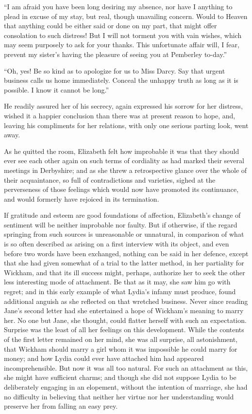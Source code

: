 ``I am afraid you have been long desiring my absence, nor have I anything to plead in excuse of my stay, but real, though unavailing concern. Would to Heaven that anything could be either said or done on my part, that might offer consolation to such distress! But I will not torment you with vain wishes, which may seem purposely to ask for your thanks. This unfortunate affair will, I fear, prevent my sister's having the pleasure of seeing you at Pemberley to-day.''

``Oh, yes! Be so kind as to apologize for us to Miss Darcy. Say that urgent business calls us home immediately. Conceal the unhappy truth as long as it is possible. I know it cannot be long.''

He readily assured her of his secrecy, again expressed his sorrow for her distress, wished it a happier conclusion than there was at present reason to hope, and, leaving his compliments for her relations, with only one serious parting look, went away.

As he quitted the room, Elizabeth felt how improbable it was that they should ever see each other again on such terms of cordiality as had marked their several meetings in Derbyshire; and as she threw a retrospective glance over the whole of their acquaintance, so full of contradictions and varieties, sighed at the perverseness of those feelings which would now have promoted its continuance, and would formerly have rejoiced in its termination.

If gratitude and esteem are good foundations of affection, Elizabeth's change of sentiment will be neither improbable nor faulty. But if otherwise, if the regard springing from such sources is unreasonable or unnatural, in comparison of what is so often described as arising on a first interview with its object, and even before two words have been exchanged, nothing can be said in her defence, except that she had given somewhat of a trial to the latter method, in her partiality for Wickham, and that its ill success might, perhaps, authorize her to seek the other less interesting mode of attachment. Be that as it may, she saw him go with regret; and in this early example of what Lydia's infamy must produce, found additional anguish as she reflected on that wretched business. Never since reading Jane's second letter had she entertained a hope of Wickham's meaning to marry her. No one but Jane, she thought, could flatter herself with such an expectation. Surprise was the least of all her feelings on this development. While the contents of the first letter remained on her mind, she was all surprise, all astonishment, that Wickham should marry a girl whom it was impossible he could marry for money; and how Lydia could ever have attached him had appeared incomprehensible. But now it was all too natural. For such an attachment as this, she might have sufficient charms; and though she did not suppose Lydia to be deliberately engaging in an elopement, without the intention of marriage, she had no difficulty in believing that neither her virtue nor her understanding would preserve her from falling an easy prey.

